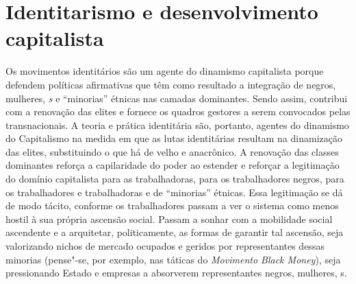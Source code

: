 \chapter{Identitarismo e desenvolvimento capitalista}

Os movimentos identitários são um agente do dinamismo capitalista porque
defendem políticas afirmativas que têm como resultado a integração de
negros, mulheres, \emph{s} e ``minorias'' étnicas nas camadas
dominantes. Sendo assim, contribui com a renovação das elites e fornece
os quadros gestores a serem convocados pelas transnacionais. A teoria e
prática identitária são, portanto, agentes do dinamismo do Capitalismo
na medida em que as lutas identitárias resultam na dinamização das
elites, substituindo o que há de velho e anacrônico. A renovação das
classes dominantes reforça a capilaridade do poder ao estender e
reforçar a legitimação do domínio capitalista para as trabalhadoras,
para os trabalhadores negros, para os trabalhadores e trabalhadoras
 e de ``minorias'' étnicas. Essa legitimação se dá de modo tácito,
conforme os trabalhadores passam a ver o sistema como menos hostil à sua
própria ascensão social. Passam a sonhar com a mobilidade social
ascendente e a arquitetar, politicamente, as formas de garantir tal
ascensão, seja valorizando nichos de mercado ocupados e geridos por
representantes dessas minorias (pense"-se, por exemplo, nas táticas do
\emph{Movimento Black Money}), seja pressionando Estado e empresas a
absorverem representantes negros, mulheres, s.

